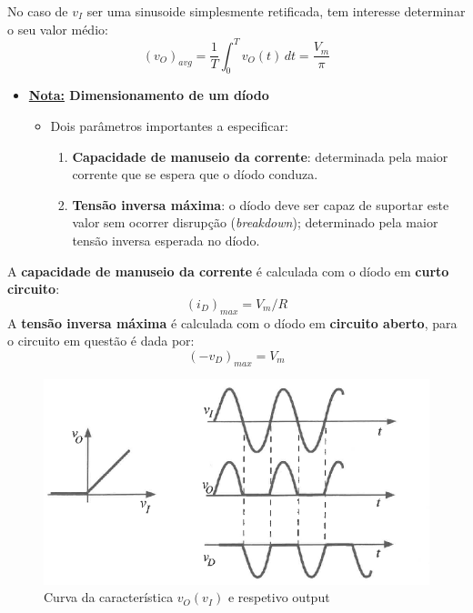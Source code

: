 \noindent No caso de $v_I$ ser uma sinusoide simplesmente retificada, tem interesse determinar o seu valor médio:
$$
    \boxed{(v_O)_{\textit{avg}} = \frac{1}{T} \int_{0}^{T} v_O(t) \, dt = \dfrac{V_m}{\pi}}
$$
\begin{mdframed}
\begin{itemize}[leftmargin=*, nolistsep]
    \item \textbf{\underline{Nota:} Dimensionamento de um díodo}
    \begin{itemize}[leftmargin=*]
    \item Dois parâmetros importantes a especificar:
        \begin{enumerate}
        \item \textbf{Capacidade de manuseio da corrente}: determinada pela maior corrente que se espera que o díodo conduza.
        \item \textbf{Tensão inversa máxima}: o díodo deve ser capaz de suportar este valor sem ocorrer disrupção (\textit{breakdown}); determinado pela maior tensão inversa esperada no díodo.
        \end{enumerate}
    \end{itemize}
\end{itemize}
\end{mdframed}

\noindent A \textbf{capacidade de manuseio da corrente} é calculada com o díodo em \textbf{curto circuito}:
$$
    \boxed{(i_D)_\textit{max} = V_m/R}
$$
\noindent A \textbf{tensão inversa máxima} é calculada com o díodo em \textbf{circuito aberto}, para o circuito em questão é dada por:
$$
    \boxed{(-v_D)_\textit{max} = V_m}
$$

\vspace{-1 em}
\begin{figure}[H]
    \centering
    \includegraphics[width = 0.8\linewidth]{img/2/ret-curve.png}
    \caption{Curva da característica $v_O(v_I)$ e respetivo output}
    \label{fig:ret-curve}
\end{figure}

